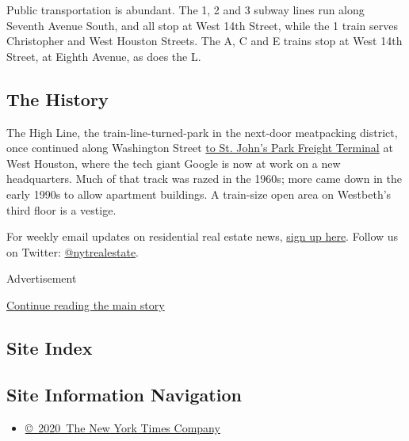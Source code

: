Public transportation is abundant. The 1, 2 and 3 subway lines run along
Seventh Avenue South, and all stop at West 14th Street, while the 1
train serves Christopher and West Houston Streets. The A, C and E trains
stop at West 14th Street, at Eighth Avenue, as does the L.

\hypertarget{the-history}{%
\subsection{The History}\label{the-history}}

The High Line, the train-line-turned-park in the next-door meatpacking
district, once continued along Washington Street
\href{https://www.nytimes3xbfgragh.onion/1991/01/15/nyregion/elevated-freight-line-being-razed-amid-protests.html?searchResultPosition=3}{to
St. John's Park Freight Terminal} at West Houston, where the tech giant
Google is now at work on a new headquarters. Much of that track was
razed in the 1960s; more came down in the early 1990s to allow apartment
buildings. A train-size open area on Westbeth's third floor is a
vestige.

For weekly email updates on residential real estate news,
\href{http://www.nytimes3xbfgragh.onion/newsletters/realestate/}{sign up
here}. Follow us on Twitter:
\href{https://twitter.com/nytrealestate}{@nytrealestate}.

Advertisement

\protect\hyperlink{after-bottom}{Continue reading the main story}

\hypertarget{site-index}{%
\subsection{Site Index}\label{site-index}}

\hypertarget{site-information-navigation}{%
\subsection{Site Information
Navigation}\label{site-information-navigation}}

\begin{itemize}
\tightlist
\item
  \href{https://help.nytimes3xbfgragh.onion/hc/en-us/articles/115014792127-Copyright-notice}{©~2020~The
  New York Times Company}
\end{itemize}

